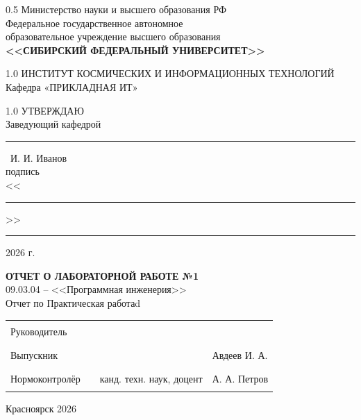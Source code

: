 \documentclass[paper=a4, fontsize=14pt, pagesize, DIV=calc, oneside]{scrreport}
\begin{document}
\begin{titlepage}
    \begin{center}
        \begin{spacing}{0.5}
        Министерство науки и высшего образования РФ\\
        {\small Федеральное государственное автономное}\\
        {\small образовательное учреждение высшего образования}\\
        \textbf{\small<<СИБИРСКИЙ ФЕДЕРАЛЬНЫЙ УНИВЕРСИТЕТ>>}\\
        \end{spacing}
        \vfill
        \begin{spacing}{1.0}
        ИНСТИТУТ КОСМИЧЕСКИХ И ИНФОРМАЦИОННЫХ ТЕХНОЛОГИЙ\\
        Кафедра «ПРИКЛАДНАЯ ИТ»\\
        \end{spacing}
    \end{center}        
    
    \begin{minipage}[h]{0.45\linewidth}\hfil\end{minipage}
    \hspace{5mm}
    \begin{minipage}[h]{0.45\linewidth}
        \begin{spacing}{1.0}
            УТВЕРЖДАЮ\\
            Заведующий кафедрой\\[10mm]
            \rule{2cm}{.1pt}~И. И. Иванов\\
            {\small подпись}\\[10mm]
            <<\rule{1cm}{.1pt}>>\rule{2.5cm}{.1pt} 2026 г.
        \end{spacing}
    \end{minipage}
    
    \vspace{7mm}
    \vfill
    \begin{center}
        {\Large \textbf{ОТЧЕТ О ЛАБОРАТОРНОЙ РАБОТЕ №1}}\\[7mm]
        09.03.04 -- <<Программная инженерия>>\\[3mm]
        Отчет по Практическая работаd
    \end{center}
    \vfill
    
\noindent
\begin{tabular}{@{} p{} >{\centering\arraybackslash} p{} p{} p{} @{}}
    Руководитель & \rule{3.5cm}{.1pt} &  &   \\
    Выпускник & \rule{3.5cm}{.1pt} & & Авдеев И. А. \\
    Нормоконтролёр & \rule{3.5cm}{.1pt} & канд. техн. наук, доцент & А. А. Петров \\
\end{tabular}

\vfill
\begin{center}Красноярск 2026\end{center}
\end{titlepage}
\restoregeometry
\end{document}
